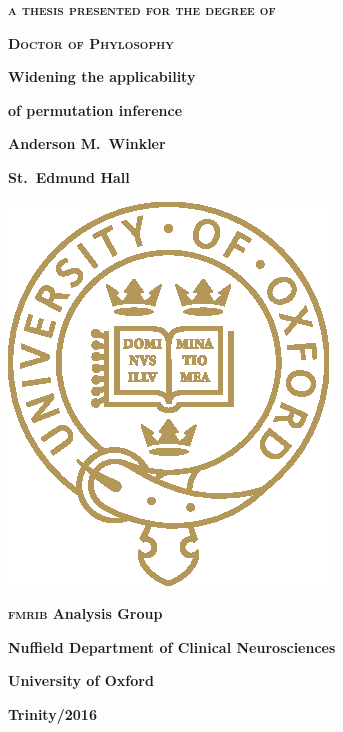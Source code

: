 \pagestyle{empty}
\begin{center}
\textbf{\textsc{a thesis presented for the degree of}}

\textbf{\textsc{Doctor of Phylosophy}}

\vspace*{\fill}

\begin{Huge}
{\color{oxblue}\textbf{Widening the applicability}}
\end{Huge}

\vspace{2mm}

\begin{Huge}
{\color{oxblue}\textbf{of permutation inference}}
\end{Huge}

\vspace*{\fill}

\textbf{Anderson M.\ Winkler}

\textbf{St.\ Edmund Hall}

\vspace*{\fill}

\includegraphics[scale=1.6]{figures/ox_logo_special_gold_pos.eps}

\vspace*{\fill}

\textbf{\textsc{fmrib} Analysis Group}

\textbf{Nuffield Department of Clinical Neurosciences}

\textbf{University of Oxford}

\vspace*{\fill}

\textbf{Trinity/2016}
\end{center}

